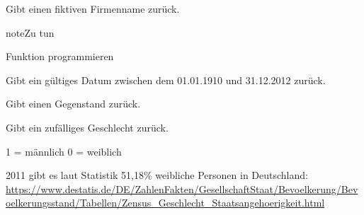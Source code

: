 \documentclass[a4paper,12pt,oneside]{sphinxmanual}
\begin{document}

\begin{fulllineitems}
\label{module:pyzufall.generator.firma}
Gibt einen fiktiven Firmenname zurück.

\begin{notice}{note}{Zu tun}

Funktion programmieren
\end{notice}

\end{fulllineitems}


\begin{fulllineitems}
\label{module:pyzufall.generator.geburtsdatum}
Gibt ein gültiges Datum zwischen dem 01.01.1910 und 31.12.2012 zurück.

\end{fulllineitems}


\begin{fulllineitems}
\label{module:pyzufall.generator.gegenstand}
Gibt einen Gegenstand zurück.

\end{fulllineitems}


\begin{fulllineitems}
\label{module:pyzufall.generator.geschlecht}
Gibt ein zufälliges Geschlecht zurück.

1 = männlich
0 = weiblich

2011 gibt es laut Statistik 51,18\% weibliche Personen in Deutschland:
\href{https://www.destatis.de/DE/ZahlenFakten/GesellschaftStaat/Bevoelkerung/Bevoelkerungsstand/Tabellen/Zensus\_Geschlecht\_Staatsangehoerigkeit.html}{https://www.destatis.de/DE/ZahlenFakten/GesellschaftStaat/Bevoelkerung/Bevoelkerungsstand/Tabellen/Zensus\_Geschlecht\_Staatsangehoerigkeit.html}

\end{fulllineitems}

\end{document}
